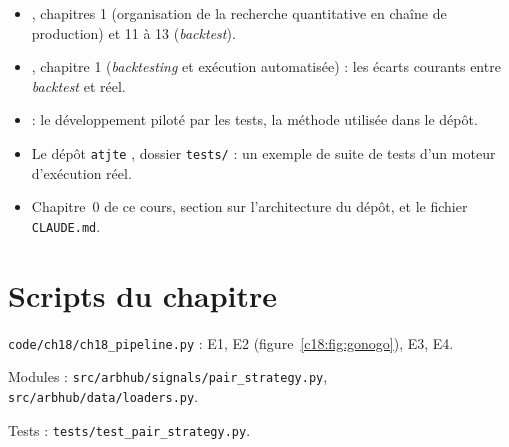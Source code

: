 \begin{toread}
\begin{itemize}[leftmargin=1.2em]
\item \citet{lopezdeprado2018}, chapitres 1 (organisation de la recherche quantitative en chaîne de production) et 11 à 13 (\emph{backtest}).
\item \citet{chan2013}, chapitre 1 (\emph{backtesting} et exécution automatisée) : les écarts courants entre \emph{backtest} et réel.
\item \citet{beck2002} : le développement piloté par les tests, la méthode utilisée dans le dépôt.
\item Le dépôt \texttt{atjte} \citep{atjte}, dossier \texttt{tests/} : un exemple de suite de tests d'un moteur d'exécution réel.
\item Chapitre~0 de ce cours, section sur l'architecture du dépôt, et le fichier \texttt{CLAUDE.md}.
\end{itemize}
\end{toread}

\section{Scripts du chapitre}
\sloppy\noindent\texttt{code/ch18/ch18\_pipeline.py} : E1, E2 (figure~\ref{c18:fig:gonogo}), E3, E4.\par\noindent Modules : \texttt{src/arbhub/signals/pair\_strategy.py}, \texttt{src/arbhub/data/loaders.py}.\par\noindent Tests : \texttt{tests/test\_pair\_strategy.py}.
